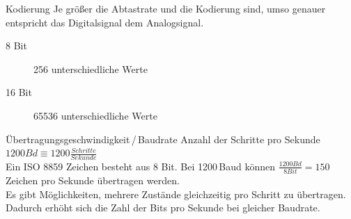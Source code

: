 \begin{frame}{Kodierung}
  Je größer die Abtastrate und die Kodierung sind, umso genauer entspricht das Digitalsignal dem Analogsignal.
  \begin{description}
    \item[8 Bit] 256 unterschiedliche Werte
    \item[16 Bit] 65536 unterschiedliche Werte
  \end{description}
\end{frame}

\begin{frame}{Übertragungsgeschwindigkeit\,/\,Baudrate}
  Anzahl der Schritte pro Sekunde\\
  $1200 Bd \equiv 1200 \frac{Schritte}{Sekunde}$\\[2em]

  Ein ISO 8859 Zeichen besteht aus 8 Bit. Bei 1200\,Baud können $\frac{1200 Bd}{8 Bit} = 150$ Zeichen pro Sekunde übertragen werden.\\[2em]

  Es gibt Möglichkeiten, mehrere Zustände gleichzeitig pro Schritt zu übertragen. Dadurch erhöht sich die Zahl der Bits pro Sekunde bei gleicher Baudrate.
\end{frame}

